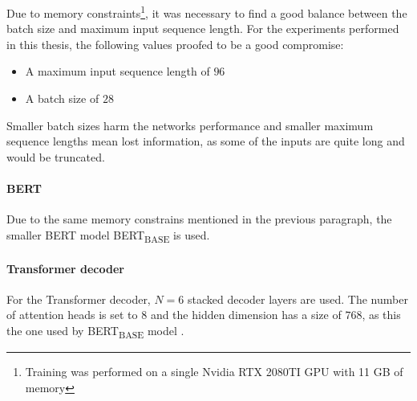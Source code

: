 Due to memory constraints\footnote{Training was performed on a single Nvidia RTX 2080TI GPU with 11 GB of memory}, it was necessary to find a good balance between the batch size and maximum input sequence length.
For the experiments performed in this thesis, the following values proofed to be a good compromise:
\begin{itemize}
\item A maximum input sequence length of $96$
\item A batch size of $28$
\end{itemize}

Smaller batch sizes harm the networks performance and smaller maximum sequence lengths mean lost information, as some of the inputs are quite long and would be truncated.

\paragraph{BERT}

Due to the same memory constrains mentioned in the previous paragraph, the smaller BERT model BERT\textsubscript{BASE} is used.

\paragraph{Transformer decoder}

For the Transformer decoder, $N=6$ stacked decoder layers are used.
The number of attention heads is set to $8$ and the hidden dimension has a size of $768$, as this the one used by BERT\textsubscript{BASE} model \cite[p.~3]{devlin2018bert}.